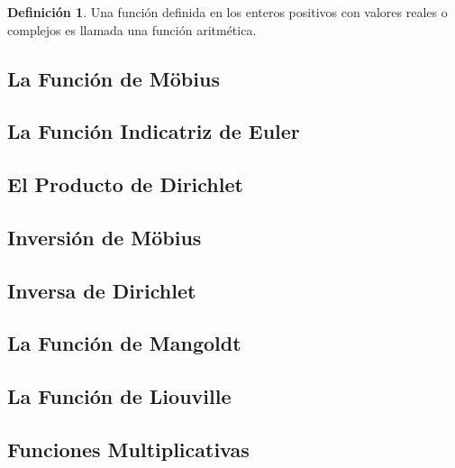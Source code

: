 \documentclass{article}
\theoremstyle{definition}
\newtheorem{defn}[theorem]{Definici\'on}
\theoremstyle{remark}
\begin{document}
\begin{defn}
    Una funci\'on definida en los enteros positivos con valores reales o complejos es llamada una funci\'on aritm\'etica.
\end{defn}

\subsection{La Funci\'on de M\"obius}


\subsection{La Funci\'on Indicatriz de Euler}


\subsection{El Producto de Dirichlet}


\subsection{Inversi\'on de M\"obius}


\subsection{Inversa de Dirichlet}


\subsection{La Funci\'on de Mangoldt}


\subsection{La Funci\'on de Liouville}


\subsection{Funciones Multiplicativas}

\end{document}
